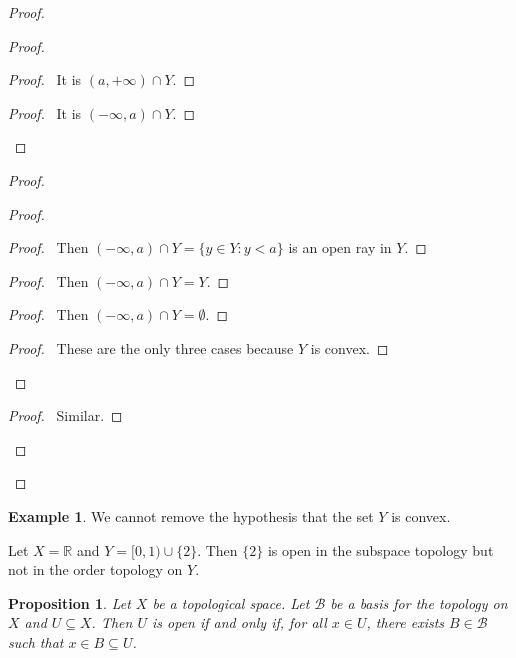 \documentclass{book}
\let\qed\relax
\newtheorem{prop}[ax]{Proposition}
\theoremstyle{definition}
\newtheorem{ex}[ax]{Example}
\begin{document}
\begin{proof}
\pf
{}
\begin{proof}
	\begin{proof}
		\pf\ It is $(a, +\infty) \cap Y$.
	\end{proof}
	\begin{proof}
		\pf\ It is $(-\infty, a) \cap Y$.
	\end{proof}
\end{proof}
\begin{proof}
	\begin{proof}
		\begin{proof}
			\pf\ Then $(-\infty, a) \cap Y = \{ y \in Y : y < a\}$ is an open ray in $Y$.
		\end{proof}
		\begin{proof}
			\pf\ Then $(-\infty, a) \cap Y = Y$. 
		\end{proof}
		\begin{proof}
			\pf\ Then $(-\infty, a) \cap Y = \emptyset$. 
		\end{proof}
		\qedstep
		\begin{proof}
			\pf\ These are the only three cases because $Y$ is convex.
		\end{proof}
	\end{proof}
	\begin{proof}
		\pf\ Similar.
	\end{proof}
\end{proof}
\qed
\end{proof}

\begin{ex}
We cannot remove the hypothesis that the set $Y$ is convex.

Let $X = \mathbb{R}$ and $Y = [0,1) \cup \{2\}$. Then $\{2\}$ is open in the subspace topology but not in the order topology on $Y$.
\end{ex}

\begin{prop}
Let $X$ be a topological space. Let $\mathcal{B}$ be a basis for the topology on $X$ and $U \subseteq X$. Then $U$ is open if and only if, for all $x \in U$, there exists $B \in \mathcal{B}$ such that $x \in B \subseteq U$.
\end{prop}
\end{document}

